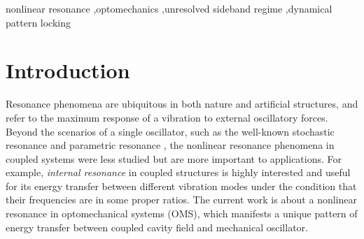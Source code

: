 \documentclass[a4paper,fleqn]{cas-dc}
\begin{document}


\begin{keywords}
nonlinear resonance \sep optomechanics \sep unresolved sideband regime \sep dynamical pattern locking
\end{keywords}


\maketitle

\section{Introduction}
Resonance phenomena are ubiquitous in both nature and artificial structures, and refer to the maximum response of a vibration to external oscillatory forces. Beyond the scenarios of a single oscillator, such as the well-known stochastic resonance \cite{gammaitoni1998stochastic} and parametric resonance \cite{fossen2011parametric}, the nonlinear resonance phenomena in coupled systems were less studied but are more important to applications. For example, {\it internal resonance} in coupled structures \cite{jackson1963nonlinear,ford1963computer,manevitch2005mechanics,bajaj2018internal} is highly interested and useful for its energy transfer between different vibration modes under the condition that their frequencies are in some proper ratios. The current work is about a nonlinear resonance in optomechanical systems (OMS), which manifests a unique pattern of energy transfer between coupled cavity field and mechanical oscillator. 
\end{document}
